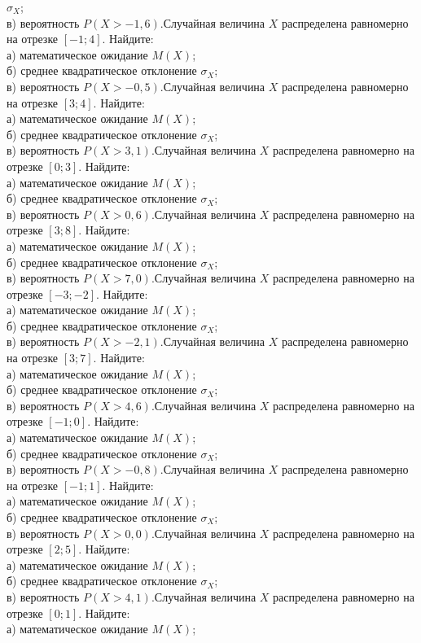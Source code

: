 $\sigma_X$; \\ \quad в) вероятность $P(X>-1{,}6)$.Случайная величина $X$ распределена равномерно на отрезке $[-1; 4]$. Найдите: \\ \quad а) математическое ожидание $M(X)$; \\ \quad б) среднее квадратическое отклонение $\sigma_X$; \\ \quad в) вероятность $P(X>-0{,}5)$.Случайная величина $X$ распределена равномерно на отрезке $[3; 4]$. Найдите: \\ \quad а) математическое ожидание $M(X)$; \\ \quad б) среднее квадратическое отклонение $\sigma_X$; \\ \quad в) вероятность $P(X>3{,}1)$.Случайная величина $X$ распределена равномерно на отрезке $[0; 3]$. Найдите: \\ \quad а) математическое ожидание $M(X)$; \\ \quad б) среднее квадратическое отклонение $\sigma_X$; \\ \quad в) вероятность $P(X>0{,}6)$.Случайная величина $X$ распределена равномерно на отрезке $[3; 8]$. Найдите: \\ \quad а) математическое ожидание $M(X)$; \\ \quad б) среднее квадратическое отклонение $\sigma_X$; \\ \quad в) вероятность $P(X>7{,}0)$.Случайная величина $X$ распределена равномерно на отрезке $[-3; -2]$. Найдите: \\ \quad а) математическое ожидание $M(X)$; \\ \quad б) среднее квадратическое отклонение $\sigma_X$; \\ \quad в) вероятность $P(X>-2{,}1)$.Случайная величина $X$ распределена равномерно на отрезке $[3; 7]$. Найдите: \\ \quad а) математическое ожидание $M(X)$; \\ \quad б) среднее квадратическое отклонение $\sigma_X$; \\ \quad в) вероятность $P(X>4{,}6)$.Случайная величина $X$ распределена равномерно на отрезке $[-1; 0]$. Найдите: \\ \quad а) математическое ожидание $M(X)$; \\ \quad б) среднее квадратическое отклонение $\sigma_X$; \\ \quad в) вероятность $P(X>-0{,}8)$.Случайная величина $X$ распределена равномерно на отрезке $[-1; 1]$. Найдите: \\ \quad а) математическое ожидание $M(X)$; \\ \quad б) среднее квадратическое отклонение $\sigma_X$; \\ \quad в) вероятность $P(X>0{,}0)$.Случайная величина $X$ распределена равномерно на отрезке $[2; 5]$. Найдите: \\ \quad а) математическое ожидание $M(X)$; \\ \quad б) среднее квадратическое отклонение $\sigma_X$; \\ \quad в) вероятность $P(X>4{,}1)$.Случайная величина $X$ распределена равномерно на отрезке $[0; 1]$. Найдите: \\ \quad а) математическое ожидание $M(X)$; \\ \quad 
